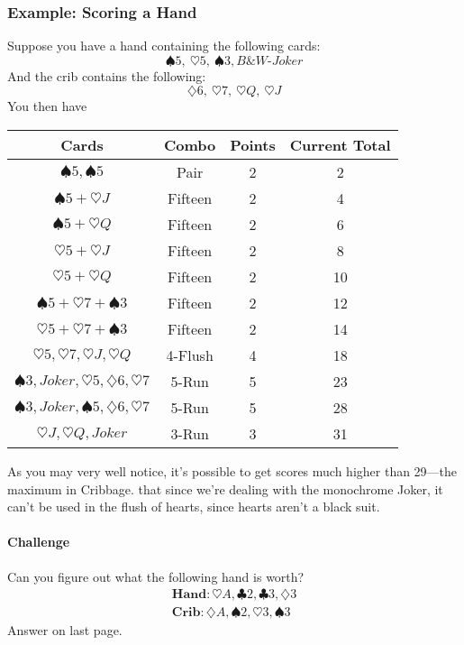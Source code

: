 \subsubsection{Example: Scoring a Hand}
Suppose you have a hand containing the following cards:
\[ \spadesuit 5,\ \heartsuit 5,\ \spadesuit 3, \textit{B\&W-Joker} \]
And the crib contains the following:
\[ \diamondsuit 6,\ \heartsuit 7,\ \heartsuit Q,\ \heartsuit J\]
You then have
\begin{center}
\begin{tabular}{c|c|c|c}
    Cards & Combo & Points & Current Total\\\hline
    $\spadesuit 5, \spadesuit 5$ & Pair & 2 & 2\\
    $\spadesuit 5 + \heartsuit J$ & Fifteen & 2 & 4 \\
    $\spadesuit 5 + \heartsuit Q$ & Fifteen & 2 & 6 \\
    $\heartsuit 5 + \heartsuit J$ & Fifteen & 2 & 8 \\
    $\heartsuit 5 + \heartsuit Q$ & Fifteen & 2 & 10 \\
    $\spadesuit 5 + \heartsuit 7 + \spadesuit 3$ & Fifteen & 2 & 12\\
    $\heartsuit 5 + \heartsuit 7 + \spadesuit 3$ & Fifteen & 2 & 14\\
    $\heartsuit 5, \heartsuit 7, \heartsuit J, \heartsuit Q$ & 4-Flush & 4 & 18\\
    $\spadesuit 3, Joker, \heartsuit 5, \diamondsuit 6, \heartsuit 7$ & 5-Run & 5 & 23\\
    $\spadesuit 3, Joker, \spadesuit 5, \diamondsuit 6, \heartsuit 7$ & 5-Run & 5 & 28\\
    $\heartsuit J, \heartsuit Q, Joker$ & 3-Run & 3 & 31\\ 
\end{tabular}
\end{center}
As you may very well notice, it's possible to get scores much higher than 29---the maximum in Cribbage.
\note that since we're dealing with the monochrome Joker, it can't be used in the flush of hearts, since hearts aren't a black suit.

\paragraph{Challenge} Can you figure out what the following hand is worth?
\begin{align*}
\mathbf{Hand}: \heartsuit A, \clubsuit 2, \clubsuit 3, \diamondsuit 3\\
\mathbf{Crib}: \diamondsuit A, \spadesuit 2, \heartsuit 3, \spadesuit 3
\end{align*}
Answer on last page.